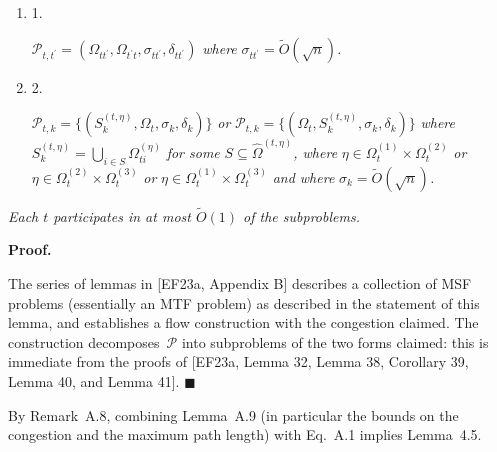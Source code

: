 \begin{enumerate}


\item[] 1. 


$\mathcal{P}_{t,t^{\prime}}=(\Omega_{tt^{\prime}},\Omega_{t^{\prime}t},\sigma_{tt^{\prime}},\delta_{tt^{\prime}})$\emph{ where }$\sigma_{tt^{\prime}}=\widetilde{O}(\sqrt{n})$\emph{.}\par




\item[] 2. 


$\mathcal{P}_{t,k}=\{(S_{k}^{(t,\eta)},\Omega_{t},\sigma_{k},\delta_{k})\}$\emph{ or }$\mathcal{P}_{t,k}=\{(\Omega_{t},S_{k}^{(t,\eta)},\sigma_{k},\delta_{k})\}$\emph{ where }$S_{k}^{(t,\eta)}=\bigcup_{i\in S}\Omega_{ti}^{(\eta)}$\emph{ for some }$S\subseteq\hat{\Omega}^{(t,\eta)}$\emph{, where }$\eta\in\Omega_{t}^{(1)}\times\Omega_{t}^{(2)}$\emph{ or }$\eta\in\Omega_{t}^{(2)}\times\Omega_{t}^{(3)}$\emph{ or }$\eta\in\Omega_{t}^{(1)}\times\Omega_{t}^{(3)}$\emph{ and where }$\sigma_{k}=\widetilde{O}(\sqrt{n})$\emph{.}\par




\end{enumerate}


\emph{Each $t$ participates in at most $\widetilde{O}(1)$ of the subproblems.}\par






\par\medskip\noindent\textbf{Proof.}\par



The series of lemmas in [EF23a, Appendix B] describes a collection of MSF problems (essentially an MTF problem) as described in the statement of this lemma, and establishes a flow construction with the congestion claimed. The construction decomposes $\mathcal{P}$ into subproblems of the two forms claimed: this is immediate from the proofs of [EF23a, Lemma 32, Lemma 38, Corollary 39, Lemma 40, and Lemma 41].
\ensuremath{\blacksquare}\par





By Remark A.8, combining Lemma A.9 (in particular the bounds on the congestion and the maximum path length) with Eq. A.1 implies Lemma 4.5.\par





